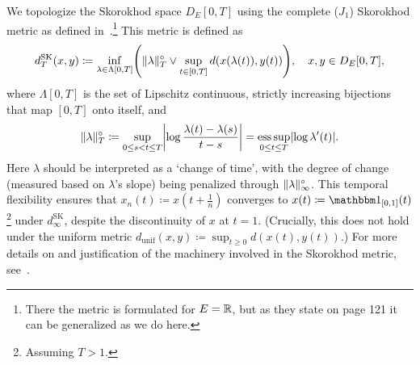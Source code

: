 We topologize the Skorokhod space \( D_E[0,T] \) using the complete (\( J_1 \)) Skorokhod metric as defined in~\cite[125]{billingsleyConvergenceProbabilityMeasures1999}.\footnote{There the metric is formulated for \( E = \mathbb{R} \), but as they state on page 121 it can be generalized as we do here.}
This metric is defined as
\begin{equation}\label{eq:d_T-def}
  d_T^\mathrm{SK} (x,y) \coloneqq \inf_{\lambda \in \Lambda[0,T]} \br*{ \norm{\lambda}_T^\circ \lor \sup_{t \in [0,T]} d(x(\lambda(t)), y(t)) }, \quad x, y \in D_E[0,T],
\end{equation}
where \( \Lambda[0,T] \) is the set of Lipschitz continuous, strictly increasing bijections that map \( [0,T] \) onto itself, and
\begin{equation}\label{eq:lambda-norm}
  \norm{\lambda}_T^\circ \coloneqq \sup_{0 \leq s < t \leq T} \abs*{ \log \frac{\lambda(t)-\lambda(s)}{t-s} }
  = \esssup_{0 \leq t \leq T} \abs{ \log \lambda'(t) }.    %
\end{equation}
Here \( \lambda \) should be interpreted as a `change of time', with the degree of change (measured based on \( \lambda \)'s slope) being penalized through \( \lVert\lambda\rVert_\infty^\circ \).
This temporal flexibility ensures that \( x_n(t) \coloneqq x(t + \frac{1}{n}) \) converges to \( x(t) \coloneqq \indE{[0,1]}(t) \)\footnote{Assuming \( T > 1 \).} under \( d_\infty^\mathrm{SK} \), despite the discontinuity of \( x \) at \( t = 1 \).
(Crucially, this does not hold under the uniform metric \( d_\mathrm{unif}(x,y) \coloneqq \sup_{t \geq 0} d(x(t), y(t)) \).)
For more details on and justification of the machinery involved in the Skorokhod metric, see~\cite{kernSkorokhodTopologiesWhat2024}.

